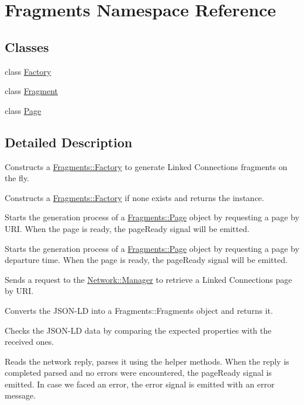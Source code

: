 \hypertarget{namespaceFragments}{}\section{Fragments Namespace Reference}
\label{namespaceFragments}
\subsection*{Classes}
\begin{DoxyCompactItemize}
\item 
class \mbox{\hyperlink{classFragments_1_1Factory}{Factory}}
\item 
class \mbox{\hyperlink{classFragments_1_1Fragment}{Fragment}}
\item 
class \mbox{\hyperlink{classFragments_1_1Page}{Page}}
\end{DoxyCompactItemize}


\subsection{Detailed Description}
Constructs a \mbox{\hyperlink{classFragments_1_1Factory}{Fragments\+::\+Factory}} to generate Linked Connections fragments on the fly.

Constructs a \mbox{\hyperlink{classFragments_1_1Factory}{Fragments\+::\+Factory}} if none exists and returns the instance.

Starts the generation process of a \mbox{\hyperlink{classFragments_1_1Page}{Fragments\+::\+Page}} object by requesting a page by U\+RI. When the page is ready, the page\+Ready signal will be emitted.

Starts the generation process of a \mbox{\hyperlink{classFragments_1_1Page}{Fragments\+::\+Page}} object by requesting a page by departure time. When the page is ready, the page\+Ready signal will be emitted.

Sends a request to the \mbox{\hyperlink{classNetwork_1_1Manager}{Network\+::\+Manager}} to retrieve a Linked Connections page by U\+RI.

Converts the J\+S\+O\+N-\/\+LD into a Fragments\+::\+Fragments object and returns it.

Checks the J\+S\+O\+N-\/\+LD data by comparing the expected properties with the received ones.

Reads the network reply, parses it using the helper methods. When the reply is completed parsed and no errors were encountered, the page\+Ready signal is emitted. In case we faced an error, the error signal is emitted with an error message.

